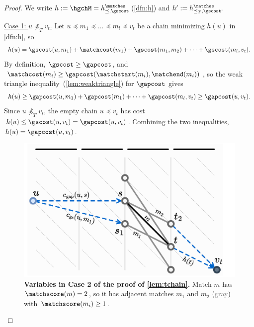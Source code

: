\begin{proof}
  We write $h:=\hgchM = h^\matches_{\preceq,\gscost}\!$ (\cref{dfn:h}) and $h':=
  h^\matches_{\preceq_T,\gscost}\!$.

  \underline{Case 1: $u\npreceq_T v_t$.}
  Let $u\preceq m_1 \preceq \dots \preceq m_l \preceq v_t$ be a chain minimizing $h(u)$ in
  \cref{dfn:h}, so
  \begin{equation*}
   h(u) = \gscost(u, m_1) + \matchcost(m_1) + \gscost(m_1, m_2) + \dots + \gscost(m_l, v_t).
  \end{equation*}
  By definition, $\gscost \geq \gapcost$, and $\matchcost(m_i) \geq
  \gapcost(\matchstart(m_i), \matchend(m_i))$, so the weak triangle
  inequality~(\cref{lem:weaktriangle}) for $\gapcost$ gives
  \begin{equation*}
   h(u) \geq \gapcost(u, m_1) + \gapcost(m_1) + \dots + \gapcost(m_l, v_t) \geq \gapcost(u, v_t).
  \end{equation*}
  Since $u {\npreceq_T} v_t$, the empty chain $u {\preceq} v_t$ has cost $h(u)
  \leq \gscost(u, v_t) = \gapcost(u, v_t)$. Combining the two inequalities, $h(u) = \gapcost(u, v_t)$.

\begin{figure}[t]
    \centering
    \includegraphics[width=0.7\linewidth]{imgs/proofs/gch-proof.pdf}%
    \caption[Variables in Case 2 of the proof of
      \cref{lem:tchain}]{\textbf{Variables in Case 2 of the proof of
      \cref{lem:tchain}.} Match $m$ has ${\matchscore(m) = 2}$, so it has
      adjacent matches $m_1$ and $m_2$ (\textcolor{gray}{gray}) with
      $\matchscore(m_i) \geq 1$.}
    \label{fig:gch-proof}
\end{figure}


\end{proof}
